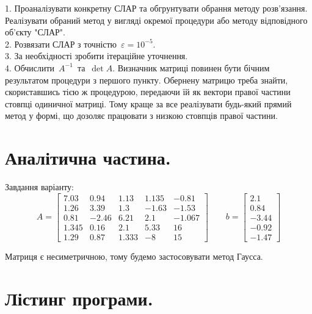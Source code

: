 \documentclass[14pt,a4paper]{scrartcl}
\theoremstyle{definition}
\theoremstyle{remark}
\theoremstyle{definition}
\theoremstyle{definition}
\begin{document}
1. Проаналізувати конкретну СЛАР та обгрунтувати обрання методу розв’язання. Реалізувати обраний метод у вигляді окремої процедури або методу відповідного об'єкту "СЛАР".\\
2. Розвязати СЛАР з точністю $\varepsilon = 10^{-5}$.\\
3. За необхідності зробити ітераційне уточнення. \\
4. Обчислити $A^{-1}$ та $\det A$. Визначник матриці повинен бути бічним результатом процедури з першого пункту. Обернену матрицю треба знайти, скориставшись тією ж процедурою, передаючи їй як вектори правої частини стовпці одиничної матриці. Тому краще за все реалізувати будь-який прямий метод у формі, що дозоляє працювати з низкою стовпців правої частини.

\section{Аналітична частина.}
Завдання варіанту:
$$
A = \begin{bmatrix}
  7.03 & 0.94 & 1.13 & 1.135 & -0.81 \\
	1.26 & 3.39 & 1.3 & -1.63 & -1.53  \\
	0.81 & -2.46 & 6.21 & 2.1 & -1.067\\
	1.345 & 0.16 & 2.1 & 5.33 & 16 \\
	1.29 & 0.87 & 1.333 & -8 & 15
\end{bmatrix} \qquad
b = \begin{bmatrix} 2.1 \\ 0.84 \\ -3.44 \\ -0.92 \\ -1.47 \end{bmatrix}
$$

Матриця є несиметричною, тому будемо застосовувати метод Гаусса.\\
\section{Лістинг програми.}
\end{document}
